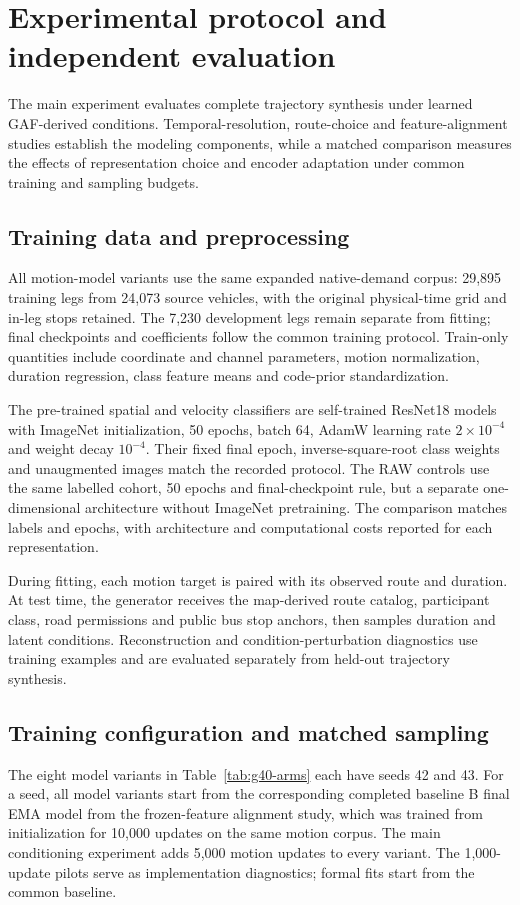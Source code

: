 \chapter{Experimental protocol and independent evaluation}
\label{ch:native-protocol}

The main experiment evaluates complete trajectory synthesis under learned GAF-derived conditions. Temporal-resolution, route-choice and feature-alignment studies establish the modeling components, while a matched comparison measures the effects of representation choice and encoder adaptation under common training and sampling budgets.

\section{Training data and preprocessing}
All motion-model variants use the same expanded native-demand corpus: 29,895 training legs from 24,073 source vehicles, with the original physical-time grid and in-leg stops retained. The 7,230 development legs remain separate from fitting; final checkpoints and coefficients follow the common training protocol. Train-only quantities include coordinate and channel parameters, motion normalization, duration regression, class feature means and code-prior standardization.

The pre-trained spatial and velocity classifiers are self-trained ResNet18 models with ImageNet initialization, 50 epochs, batch 64, AdamW learning rate $2\times10^{-4}$ and weight decay $10^{-4}$. Their fixed final epoch, inverse-square-root class weights and unaugmented images match the recorded protocol. The RAW controls use the same labelled cohort, 50 epochs and final-checkpoint rule, but a separate one-dimensional architecture without ImageNet pretraining. The comparison matches labels and epochs, with architecture and computational costs reported for each representation.

During fitting, each motion target is paired with its observed route and duration. At test time, the generator receives the map-derived route catalog, participant class, road permissions and public bus stop anchors, then samples duration and latent conditions. Reconstruction and condition-perturbation diagnostics use training examples and are evaluated separately from held-out trajectory synthesis.

\section{Training configuration and matched sampling}
The eight model variants in Table~\ref{tab:g40-arms} each have seeds 42 and 43. For a seed, all model variants start from the corresponding completed baseline B final EMA model from the frozen-feature alignment study, which was trained from initialization for 10,000 updates on the same motion corpus. The main conditioning experiment adds 5,000 motion updates to every variant. The 1,000-update pilots serve as implementation diagnostics; formal fits start from the common baseline.

